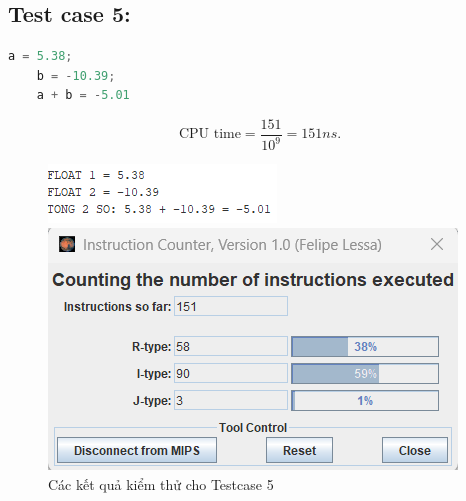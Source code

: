 \subsection{Test case 5:}
\begin{lstlisting}[language=Python]
    a = 5.38;
    b = -10.39;
    a + b = -5.01
\end{lstlisting}
\[
\text{CPU time} = \frac{\text{151}}{10^9} = 151 ns.
\]
\begin{figure}[!h]
    \centering
    \begin{minipage}[b]{0.48\textwidth}
        \centering
        \includegraphics[width=\textwidth]{image/TESTCASE/Testcase 5.png}
    \end{minipage}
    \hfill
    \begin{minipage}[b]{0.48\textwidth}
        \centering
        \includegraphics[width=\textwidth]{image/TESTCASE/Instruction Counter 5.png}
    \end{minipage}
    \vspace{0.5cm}
    \caption{Các kết quả kiểm thử cho Testcase 5}
\end{figure}

\vspace{0.5 cm}

